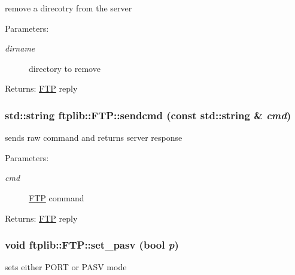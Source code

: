 remove a direcotry from the server 

\begin{Desc}
\item[Parameters:]
\begin{description}
\item[{\em dirname}]directory to remove \end{description}
\end{Desc}
\begin{Desc}
\item[Returns:]\hyperlink{classftplib_1_1FTP}{FTP} reply \end{Desc}
\hypertarget{classftplib_1_1FTP_5a876d670107df4b5924238450440eee}{
\subsubsection[{sendcmd}]{\setlength{\rightskip}{0pt plus 5cm}std::string ftplib::FTP::sendcmd (const std::string \& {\em cmd})}}
\label{classftplib_1_1FTP_5a876d670107df4b5924238450440eee}


sends raw command and returns server response 

\begin{Desc}
\item[Parameters:]
\begin{description}
\item[{\em cmd}]\hyperlink{classftplib_1_1FTP}{FTP} command \end{description}
\end{Desc}
\begin{Desc}
\item[Returns:]\hyperlink{classftplib_1_1FTP}{FTP} reply \end{Desc}
\hypertarget{classftplib_1_1FTP_e35230239f093f01fb295ccb007de1b2}{
\subsubsection[{set\_\-pasv}]{\setlength{\rightskip}{0pt plus 5cm}void ftplib::FTP::set\_\-pasv (bool {\em p})}}
\label{classftplib_1_1FTP_e35230239f093f01fb295ccb007de1b2}


sets either PORT or PASV mode 

